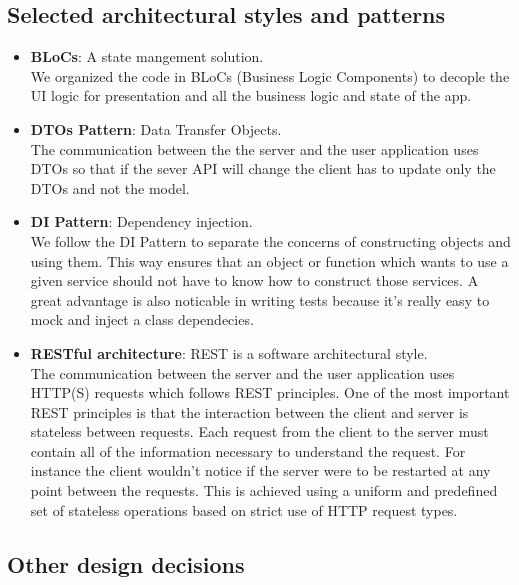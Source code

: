 \documentclass{article}
\begin{document}
\subsection{Selected architectural styles and patterns}
\begin{itemize}
	\item \textbf{BLoCs}: A state mangement solution. \\
		We organized the code in BLoCs (Business Logic Components) to decople the UI logic for presentation and all the business logic and state of the app.
	
	\item \textbf{DTOs Pattern}: Data Transfer Objects. \\
		The communication between the the server and the user application uses DTOs so that if the sever API will change the client has to update only the DTOs and not the model.
		
	\item \textbf{DI Pattern}: Dependency injection. \\
		We follow the DI Pattern to separate the concerns of constructing objects and using them. 
		This way ensures that an object or function which wants to use a given service should not have to know how to construct those services.
		A great advantage is also noticable in writing tests because it's really easy to mock and inject a class dependecies.
		
	\item \textbf{RESTful architecture}: REST is a software architectural style. \\
		The communication between the server and the user application uses HTTP(S) requests which follows REST principles.
		One of the most important REST principles is that the interaction between the client and server is stateless between requests. Each request from the client to the server must contain all of the information necessary to understand the request. For instance the client wouldn’t notice if the server were to be restarted at any point between the requests.
		This is achieved using a uniform and predefined set of stateless operations based on strict use of HTTP request types.
	
\end{itemize}

\newpage

\subsection{Other design decisions}
\end{document}
